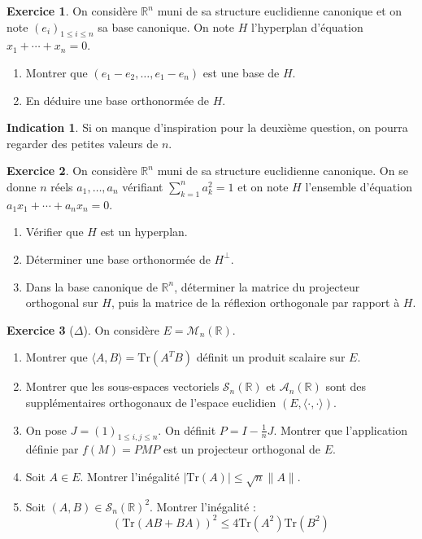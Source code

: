 \documentclass[french]{book}
\newcommand{\R}{\mathbb{R}}
\newcommand{\Tr}{\text{Tr}}
\theoremstyle{definition}
\newtheorem{ex}{Exercice}[chapter]
\theoremstyle{theorem}
\newtheorem*{ind}{Indication}
\theoremstyle{remark}
\begin{document}
\begin{ex}
	On considère $\R^n$ muni de sa structure euclidienne canonique et on note $(e_i)_{1\leqslant i\leqslant n}$ sa base canonique. On note $H$ l'hyperplan d'équation $x_1+\cdots+x_n=0$.
	\begin{enumerate}
		\item Montrer que $(e_1-e_2,\ldots,e_1-e_n)$ est une base de $H$.
		\item En déduire une base orthonormée de $H$.
	\end{enumerate}
\end{ex}

\begin{ind}
	Si on manque d'inspiration pour la deuxième question, on pourra regarder des petites valeurs de $n$.
\end{ind}

\begin{ex}
	On considère $\R^n$ muni de sa structure euclidienne canonique. On se donne $n$ réels $a_1,\ldots,a_n$ vérifiant $\displaystyle\sum_{k=1}^{n}a_k^2=1$ et on note $H$ l'ensemble d'équation $a_1x_1+\cdots+a_nx_n=0$.
	\begin{enumerate}
		\item Vérifier que $H$ est un hyperplan.
		\item Déterminer une base orthonormée de $H^\bot$.
		\item Dans la base canonique de $\R^n$, déterminer la matrice du projecteur orthogonal sur $H$, puis la matrice de la réflexion orthogonale par rapport à $H$.
	\end{enumerate}
\end{ex}

\begin{ex}[$\Delta$]
	On considère $E=\mathcal{M}_n(\R)$.
	\begin{enumerate}
		\item Montrer que $\langle A,B\rangle=\Tr(A^TB)$ définit un produit scalaire sur $E$.
		\item Montrer que les sous-espaces vectoriels $\mathcal{S}_n(\R)$ et $\mathcal{A}_n(\R)$ sont des supplémentaires orthogonaux de l'espace euclidien $(E,\langle\cdot,\cdot\rangle)$.
		\item On pose $J=(1)_{1\leqslant i,j\leqslant n}$. On définit $P=\displaystyle I-\frac{1}{n}J$. Montrer que l'application définie par $f(M)=PMP$ est un projecteur orthogonal de $E$.
		\item Soit $A\in E$. Montrer l'inégalité $\lvert\Tr(A)\rvert\leqslant\sqrt{n}\lVert A\rVert$.
		\item Soit $(A,B)\in\mathcal{S}_n(\R)^2$. Montrer l'inégalité : $$\left(\Tr(AB+BA)\right)^2\leqslant4\Tr(A^2)\Tr(B^2)$$
	\end{enumerate}
\end{ex}
\end{document}
